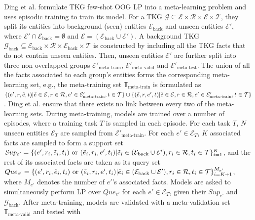 \documentclass[runningheads]{llncs}
\begin{document}
Ding et al. \cite{ding2022few} formulate TKG few-shot OOG LP into a meta-learning problem and 
uses episodic training \cite{DBLP:conf/nips/VinyalsBLKW16} to train its model. 
For a TKG $\mathcal{G}\subseteq \mathcal{E} \times \mathcal{R} \times \mathcal{E} \times \mathcal{T}$, 
they split its entities into background (seen) entities $\mathcal{E}_{\text{back}}$ 
and unseen entities $\mathcal{E}'$, where $\mathcal{E}' \cap \mathcal{E}_{\text{back}} = \emptyset$ 
and $\mathcal{E} = (\mathcal{E}_{\text{back}} \cup \mathcal{E}')$. A background TKG 
$\mathcal{G}_{\text{back}} \subseteq \mathcal{E}_{\text{back}} \times \mathcal{R} \times \mathcal{E}_{\text{back}} \times \mathcal{T}$ 
is constructed by including all the TKG facts that do not contain unseen entities. 
Then, unseen entities $\mathcal{E}'$ are further split into three non-overlapped 
groups $\mathcal{E}'_\text{meta-train}$, $\mathcal{E}'_\text{meta-valid}$ and $\mathcal{E}'_\text{meta-test}$. 
The union of all the facts associated to each group's entities forms the corresponding 
meta-learning set, e.g., 
the meta-training set $\mathbb{T}_{\text{meta-train}}$ is formulated as 
$\{(e',r, \Tilde{e},t)|\Tilde{e} \in \mathcal{E}, r \in \mathcal{R}, e' \in \mathcal{E}'_{\text{meta-train}}, t \in \mathcal{T}\} \cup \{(\Tilde{e},r, e',t)|\Tilde{e} \in \mathcal{E}, r \in \mathcal{R}, e' \in \mathcal{E}'_{\text{meta-train}}, t \in \mathcal{T}\}$. 
Ding et al. ensure that there exists no link between every two of the meta-learning sets. 
During meta-training, models are trained over a number of episodes, where a training task $T$ is sampled in each episode. 
For each task $T$, $N$ unseen entities $\mathcal{E}_T$ are sampled 
from $\mathcal{E}'_\text{meta-train}$. For each $e' \in \mathcal{E}_T$, $K$ associated 
facts are sampled to form a support set $Sup_{e'} = \{(e',r_i,\Tilde{e}_i,t_i) \ \text{or}\  (\Tilde{e}_i,r_i,e',t_i)|\Tilde{e}_i \in (\mathcal{E}_{\text{back}} \cup \mathcal{E}'), r_i \in \mathcal{R}, t_i \in \mathcal{T}\}^K_{i=1}$, 
and the rest of its associated facts are taken as its query set 
$Que_{e'} = \{(e',r_i,\Tilde{e}_i,t_i) \ \text{or}\  (\Tilde{e}_i,r_i,e',t_i)|\Tilde{e}_i \in (\mathcal{E}_{\text{back}} \cup \mathcal{E}'), r_i \in \mathcal{R}, t_i \in \mathcal{T}\}^{M_{e'}}_{i=K+1}$, 
where $M_{e'}$ denotes the number of $e'$'s associated facts. Models are asked to 
simultaneously perform LP over $Que_{e'}$ for each $e' \in \mathcal{E}_T$, 
given their $Sup_{e'}$ and $\mathcal{G}_{\text{back}}$. After meta-training, models are 
validated with a meta-validation set $\mathbb{T}_{\text{meta-valid}}$ and tested with 
\end{document}
